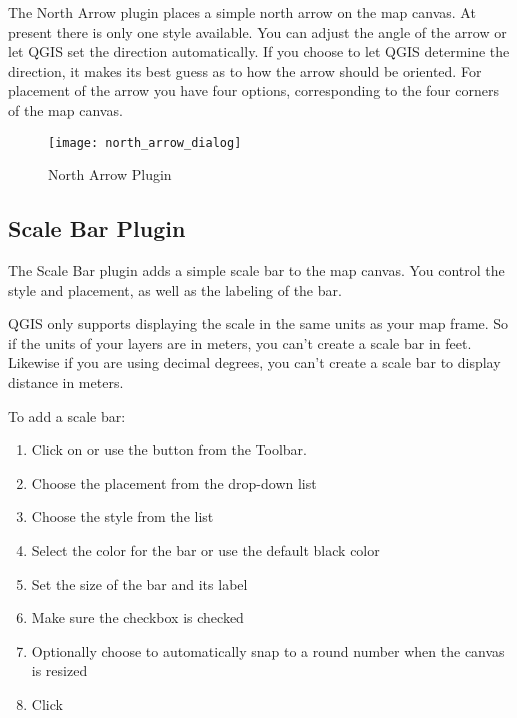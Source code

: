 The North Arrow plugin places a simple north arrow on the map canvas. At
present there is only one style available. You can adjust the angle of the
arrow or let QGIS set the direction automatically. If you choose to let
QGIS determine the direction, it makes its best guess as to how the arrow
should be oriented. For placement of the arrow you have four options,
corresponding to the four corners of the map canvas.

\begin{figure}[ht]
   \centering
   \texttt{[image: north\_arrow\_dialog]}
   \caption{North Arrow Plugin \nixcaption}\label{fig:north_arrow}
\end{figure}

\subsection{Scale Bar Plugin}\label{scalebar}

The Scale Bar plugin adds a simple scale bar to the map canvas. You
control the style and placement, as well as the labeling of the bar.

QGIS only supports displaying the scale in the same units as your map frame. So
if the units of your layers are in meters, you can't create a scale bar in
feet. Likewise if you are using decimal degrees, you can't create a scale
bar to display distance in meters.

To add a scale bar:

\begin{enumerate}
\item Click on  \arrow {} \arrow {} or use the  button from the Toolbar.
\item Choose the placement from the  drop-down list
\item Choose the style from the  list
\item Select the color for the bar  or use the default black color
\item Set the size of the bar and its label 
\item Make sure the  checkbox is checked
\item Optionally choose to automatically snap to a round number when the
  canvas is resized 
\item Click 
\end{enumerate}

